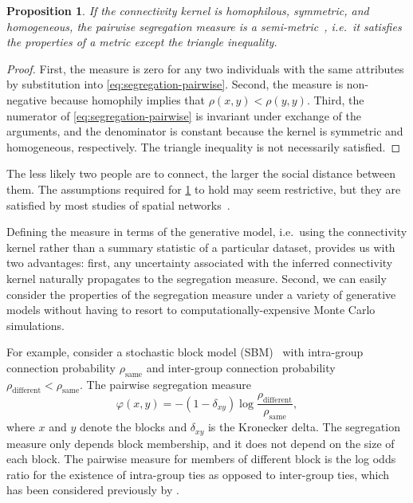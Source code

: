 \documentclass{scrartcl}
\newtheorem{prop}{Proposition}
\begin{document}

\begin{prop}\label{prop:segregations-semi-metric}
    If the connectivity kernel is homophilous, symmetric, and homogeneous, the pairwise segregation measure is a \emph{semi-metric}~\cite{Wilson1931}, i.e.\ it satisfies the properties of a metric except the triangle inequality.
\end{prop}
\begin{proof}
    First, the measure is zero for any two individuals with the same attributes by substitution into \cref{eq:segregation-pairwise}. Second, the measure is non-negative because homophily implies that $\rho(x, y)<\rho(y, y)$. Third, the numerator of \cref{eq:segregation-pairwise} is invariant under exchange of the arguments, and the denominator is constant because the kernel is symmetric and homogeneous, respectively. The triangle inequality is not necessarily satisfied.
\end{proof}

The less likely two people are to connect, the larger the social distance between them. The assumptions required for \cref{prop:segregations-semi-metric} to hold may seem restrictive, but they are satisfied by most studies of spatial networks~\cite{Butts2012,Lambiotte2008,Expert2011}.

Defining the measure in terms of the generative model, i.e.\ using the connectivity kernel rather than a summary statistic of a particular dataset, provides us with two advantages: first, any uncertainty associated with the inferred connectivity kernel naturally propagates to the segregation measure. Second, we can easily consider the properties of the segregation measure under a variety of generative models without having to resort to computationally-expensive Monte Carlo simulations.

For example, consider a stochastic block model (SBM)~\cite{Snijders2011} with intra-group connection probability $\rho_\mathrm{same}$ and inter-group connection probability $\rho_\mathrm{different}<\rho_\mathrm{same}$. The pairwise segregation measure
\[
    \varphi(x, y) = -\left(1-\delta_{xy}\right)\log\frac{\rho_\mathrm{different}}{\rho_\mathrm{same}},
\]
where $x$ and $y$ denote the blocks and $\delta_{xy}$ is the Kronecker delta. The segregation measure only depends block membership, and it does not depend on the size of each block. The pairwise measure for members of different block is the log odds ratio for the existence of intra-group ties as opposed to inter-group ties, which has been considered previously by \textcite{Moody2001}.
\end{document}
